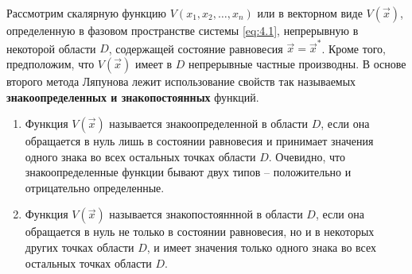 Рассмотрим скалярную функцию $V(x_1,x_2,\dots,x_n)$ или в векторном виде $V(\vec x)$, определенную в фазовом пространстве системы \eqref{eq:4.1}, непрерывную в некоторой области $D$, содержащей состояние равновесия $\vec x= \vec x^*$. Кроме того, предположим, что $V(\vec x)$ имеет в $D$ непрерывные частные производны. В основе второго метода Ляпунова лежит использование свойств так называемых 
\textbf{знакоопределенных и знакопостоянных} функций.
\begin{enumerate}
        \item Функция $V(\vec x)$ называется знакоопределенной в области $D$, если она обращается в нуль лишь в состоянии равновесия и принимает значения одного знака во всех остальных точках области $D$. Очевидно, что знакоопределенные функции бывают двух типов -- положительно и отрицательно определенные. 
        \item Функция $V(\vec x)$ называется знакопостояннной в области $D$, если она обращается в нуль не только в состоянии равновесия, но и в некоторых других точках области $D$, и имеет значения только одного знака во всех остальных точках области $D$.
\end{enumerate}


